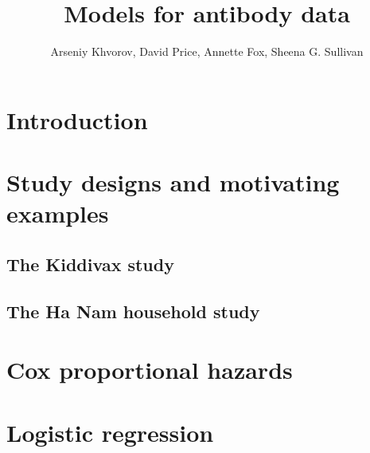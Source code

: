 \documentclass[12pt]{article}
\title{Models for antibody data}
\author{Arseniy Khvorov, David Price, Annette Fox, Sheena G. Sullivan}
\begin{document}
\maketitle


\section{Introduction}



\section{Study designs and motivating examples}



\subsection{The Kiddivax study}



\subsection{The Ha Nam household study}





\pagebreak
\section{Cox proportional hazards}



\section{Logistic regression}
\end{document}
